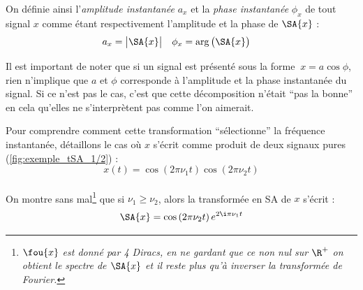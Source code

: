 \begin{definition}\label{def:ampli&phase_instant}
	On définie ainsi l'\emph{amplitude instantanée} $a_x$ et la \emph{phase instantanée} $\phi_x$  de tout signal $x$ comme étant respectivement l'amplitude et la phase de $\SA{x}$ :
	\begin{align}\label{eq:ampli&phase_cano}
		a_x &= \big|\SA{x}\big|   &   \phi_x &= \arg\big(\SA{x}\big)
	\end{align}
\end{definition}

\begin{remarque}
	Il est important de noter que si un signal est présenté sous la forme  $\ x=a\cos\phi$, rien n'implique que $a$ et $\phi$ corresponde à l'amplitude et la phase instantanée du signal. Si ce n'est pas le cas, c'est que cette décomposition n'était ``pas la bonne'' en cela qu'elles ne s’interprètent pas comme l'on aimerait.
\end{remarque}

Pour comprendre comment cette transformation ``sélectionne'' la fréquence instantanée, détaillons le cas où $x$ s'écrit comme produit de deux signaux pures (\cref{fig:exemple_tSA_1/2}) :
\[x(t) = \cos (2\pi\nu_1t)\cos (2\pi\nu_2t)\]
\\
On montre sans mal\footnote{\itshape
	$\fou{x}$ est donné par 4 Diracs, en ne gardant que ce non nul sur $\R^+$ on obtient le spectre de $\SA{x}$ et il reste plus qu'à inverser la transformée de Fourier.}
que si $\nu_1\geq\nu_2$, alors la transformée en SA de $x$ s'écrit :
\[\SA{x} = \cos \left(2\pi\nu_2 t\right) e^{2\i\pi\nu_1 t}\]

